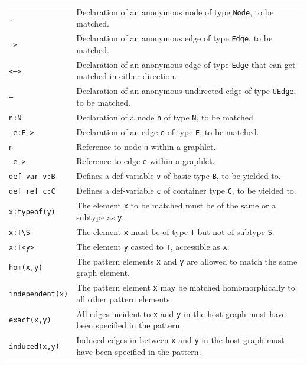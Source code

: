 \begin{table}[htbp]
\begin{minipage}{\linewidth} \renewcommand{\footnoterule}{} 
\begin{tabularx}{\linewidth}{|lX|}
\hline
\texttt{.}	& Declaration of an anonymous node of type \texttt{Node}, to be matched. \\
\texttt{-->}	& Declaration of an anonymous edge of type \texttt{Edge}, to be matched. \\
\texttt{<-->}	& Declaration of an anonymous edge of type \texttt{Edge} that can get matched in either direction. \\
\texttt{--}	& Declaration of an anonymous undirected edge of type \texttt{UEdge}, to be matched. \\
\texttt{n:N} & Declaration of a node \texttt{n} of type \texttt{N}, to be matched.\\
\texttt{-e:E->} & Declaration of an edge \texttt{e} of type \texttt{E}, to be matched.\\
\texttt{n} & Reference to node \texttt{n} within a graphlet.\\
\texttt{-e->} & Reference to edge \texttt{e} within a graphlet.\\
\texttt{def var v:B}	& Defines a def-variable \texttt{v} of basic type \texttt{B}, to be yielded to.\\
\texttt{def ref c:C}	& Defines a def-variable \texttt{c} of container type \texttt{C}, to be yielded to.\\
\hline
\texttt{x:typeof(y)} & The element \texttt{x} to be matched must be of the same or a subtype as \texttt{y}.\\
\texttt{x:T{\textbackslash}S} & The element \texttt{x} must be of type \texttt{T} but not of subtype \texttt{S}.\\
\texttt{x:T<y>} & The element \texttt{y} casted to \texttt{T}, accessible as \texttt{x}.\\
\hline
\texttt{hom(x,y)} & The pattern elements \texttt{x} and \texttt{y} are allowed to match the same graph element.\\
\texttt{independent(x)} & The pattern element \texttt{x} may be matched homomorphically to all other pattern elements.\\
\texttt{exact(x,y)} & All edges incident to \texttt{x} and \texttt{y} in the host graph must have been specified in the pattern.\\
\texttt{induced(x,y)} & Induced edges in between \texttt{x} and \texttt{y} in the host graph must have been specified in the pattern.\\

\end{tabularx}
\end{minipage}
\end{table}
